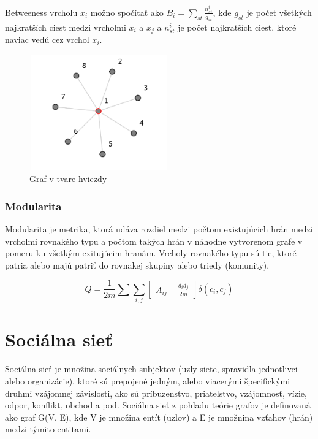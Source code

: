 \documentclass[slovak,master,public,dept460,male,cpdeclaration,oneside]{diploma}
\begin{document}
Betweeness vrcholu ${x_{i}}$ možno spočítať ako ${B_{i} = \sum_{st}^{}\frac{n^{i}_{st}}{g_{st}}}$, kde ${g_{st}}$ je počet všetkých najkratších ciest medzi vrcholmi ${x_{i}}$ a ${x_{j}}$ a ${n^{i}_{st}}$ je počet najkratších ciest, ktoré naviac vedú cez vrchol ${x_{i}}$. 

\begin{figure}[H]
\centering
\includegraphics[width=6cm, height=5cm]{figures/graph_star}
\caption{Graf v tvare hviezdy}
\end{figure}

\subsubsection{Modularita}
Modularita je metrika, ktorá udáva rozdiel medzi počtom existujúcich hrán medzi vrcholmi rovnakého typu a počtom takých hrán v náhodne vytvorenom grafe v pomeru ku všetkým exitujúcim hranám. Vrcholy rovnakého typu sú tie, ktoré patria alebo majú patriť do rovnakej skupiny alebo triedy (komunity).

\begin{mycapequ}[!ht]
      \begin{equation*}    
{
Q = \frac{1}{2m}\sum \sum_{i,j}\begin{bmatrix}
A_{ij} - \frac{d_{i}d_{j}}{2m}
\end{bmatrix} \delta (c_{i}, c_{j})
}
   \end{equation*}
   \caption{Def: Modularita}
\end{mycapequ}


\section{Sociálna sieť}

Sociálna sieť je množina sociálnych subjektov (uzly siete, spravidla jednotlivci alebo organizácie),
ktoré sú prepojené jedným, alebo viacerými špecifickými druhmi vzájomnej závislosti, ako sú príbuzenstvo, priateľstvo, vzájomnosť, vízie, odpor, konflikt, obchod a pod.
Sociálna sieť z pohľadu teórie grafov je definovaná ako graf G(V, E), kde V je množina entít
(uzlov) a E je množnina vzťahov (hrán) medzi týmito entitami.
\end{document}
